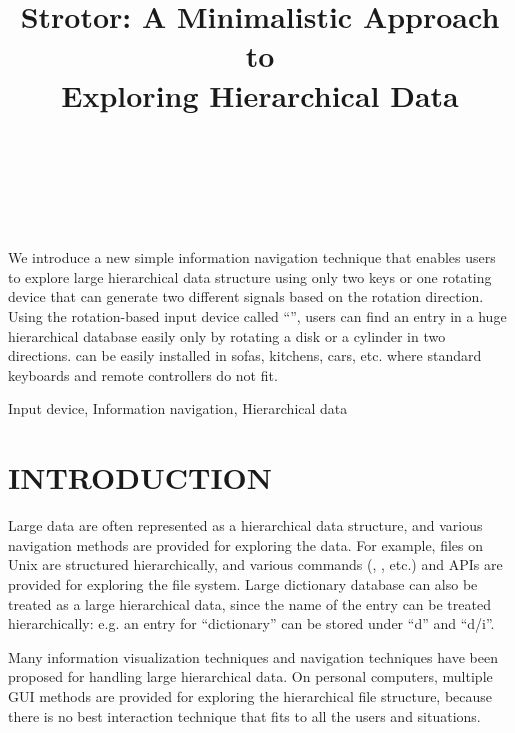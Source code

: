 \documentclass{article}
\begin{document}
\title{Strotor: A Minimalistic Approach to \\
Exploring Hierarchical Data}
\author{
\begin{tabular}{l}
\parbox{5.5cm}{
\begin{center}
~ \\
~ \\
~
\end{center}
}
\end{tabular}
}
\maketitle
\abstract
We introduce a new simple information navigation technique
that enables users to explore large hierarchical data structure
using only two keys or one rotating device that can generate
two different signals based on the rotation direction.
%
Using the rotation-based input device called ``\ST'',
users can find an entry in a huge hierarchical database easily
only by rotating a disk or a cylinder in two directions.
%
{\ST} can be easily installed in sofas, kitchens, cars, etc.
where standard keyboards and remote controllers do not fit.

\keywords Input device, Information navigation, Hierarchical data


\section*{INTRODUCTION}

Large data are often represented as a hierarchical data structure, and
various navigation methods are provided for exploring the data.
For example, files on Unix are structured hierarchically, and
various commands (, , etc.) and APIs are provided for exploring the file system.
Large dictionary database can also be treated as a large
hierarchical data, since the name of the entry can be treated hierarchically:
e.g. an entry for ``dictionary'' can be stored under ``d'' and ``d/i''.

Many information visualization techniques and navigation techniques
have been proposed for handling large hierarchical data.
On personal computers,
multiple GUI methods are provided for
exploring the hierarchical file structure, because
there is no best interaction technique that fits to all the users and situations.
\end{document}
